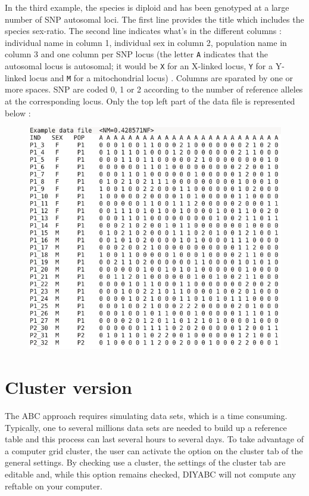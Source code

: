 In the third example, the species is diploid and has been genotyped at a large number of SNP autosomal loci. The first line provides the title which includes the species sex-ratio. The second line indicates what's in the different columns : individual name in column 1, individual sex in column 2, population name in column 3 and one column per SNP locus (the letter \texttt{A} indicates that the autosomal locus is autosomal; it would be \texttt{X} for an X-linked locus, \texttt{Y} for a Y-linked locus and \texttt{M} for a mitochondrial locus) . Columns are sparated by one or more spaces. SNP are coded 0, 1 or 2 according to the number of reference alleles at the corresponding locus. Only the top left part of the data file is represented below :

\begin{figure}[h]
\includegraphics[scale=0.5]{gui_pictures/screenga003.png}
\end{figure}



\clearpage
\section{Cluster version}\label{cluster}
The ABC approach requires simulating data sets, which is a time consuming. Typically, one to several millions data sets are needed to build up a reference table and this process can last several hours to several days. To take advantage of a computer grid cluster, the user can activate the option on the cluster tab of the general settings. By checking \textsf{use a cluster}, the settings of the cluster tab are editable and, while this option remains checked, DIYABC will not compute any reftable on your computer. 

